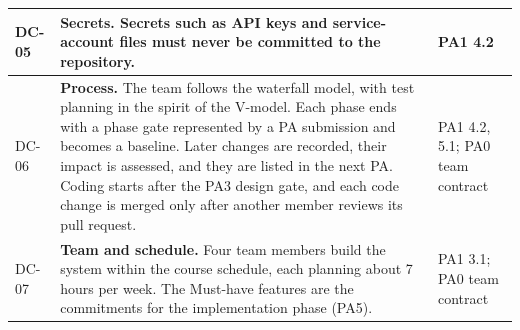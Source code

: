 \begin{longtable}{|>{\raggedright\arraybackslash}p{}|>{\raggedright\arraybackslash}p{}|>{\raggedright\arraybackslash}p{}|}
DC-05 & \textbf{Secrets.} Secrets such as API keys and service-account files must never be committed to the repository. & PA1 4.2 \\ \hline
DC-06 & \textbf{Process.} The team follows the waterfall model, with test planning in the spirit of the V-model. Each phase ends with a phase gate represented by a PA submission and becomes a baseline. Later changes are recorded, their impact is assessed, and they are listed in the next PA. Coding starts after the PA3 design gate, and each code change is merged only after another member reviews its pull request. & PA1 4.2, 5.1; PA0 team contract \\ \hline
DC-07 & \textbf{Team and schedule.} Four team members build the system within the course schedule, each planning about 7 hours per week. The Must-have features are the commitments for the implementation phase (PA5). & PA1 3.1; PA0 team contract \\ \hline
\end{longtable}
\endgroup

\clearpage